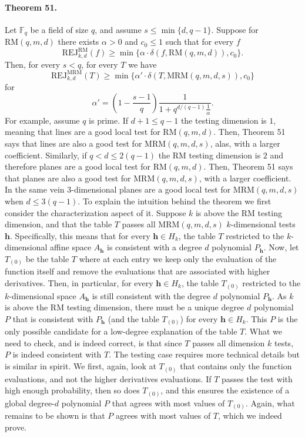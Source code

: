 \documentclass[10pt,a4paper]{article}
\begin{document}
\paragraph{Theorem 51.} Let $\mathbb F_q$ be a field of size $q$, and assume $s\leq\min\{d,q-1\}$. Suppose for $\mathrm{RM}(q,m,d)$ there exists $\alpha>0$ and $c_0\leq1$ such that for every $f$
\[\mathrm{REJ}_{k,d}^{\mathrm{RM}}(f)\geq\min\{\alpha\cdot\delta(f,\mathrm{RM}(q,m,d)),c_0\}.\]
Then, for every $s<q$, for every $T$ we have
\[\mathrm{REJ}_{k,d}^{\mathrm{MRM}}(T)\geq\min\{\alpha'\cdot\delta(T,\mathrm{MRM}(q,m,d,s)),c_0\}\tag{6}\]
for
\[\alpha'=\left(1-\frac{s-1}{q}\right)\frac1{1+q^{d/(q-1)}\frac1\alpha}.\tag{7}\]
For example, assume $q$ is prime. If $d+1\leq q-1$ the testing dimension is $1$, meaning that lines are a good local test for $\mathrm{RM}(q,m,d)$. Then, Theorem 51 says that lines are also a good test for $\mathrm{MRM}(q,m,d,s)$, alas, with a larger coefficient. Similarly, if $q<d\leq2(q-1)$ the RM testing dimension is $2$ and therefore planes are a good local test for $\mathrm{RM}(q,m,d)$. Then, Theorem 51 says that planes are also a good test for $\mathrm{MRM}(q,m,d,s)$, with a larger coefficient. In the same vein 3-dimensional planes are a good local test for $\mathrm{MRM}(q,m,d,s)$ when $d\leq3(q-1)$.
To explain the intuition behind the theorem we first consider the characterization aspect of it. Suppose $k$ is above the RM testing dimension, and that the table $T$ passes all $\mathrm{MRM}(q,m,d,s)$ $k$-dimensional tests $\boldsymbol h$. Specifically, this means that for every $\boldsymbol h\in H_k$, the table $T$ restricted to the $k$-dimensional affine space $A_{\boldsymbol h}$ is consistent with a degree $d$ polynomial $P_{\boldsymbol h}$. Now, let $T_{(0)}$ be the table $T$ where at each entry we keep only the evaluation of the function itself and remove the evaluations that are associated with higher derivatives. Then, in particular, for every $\boldsymbol h\in H_k$, the table $T_{(0)}$ restricted to the $k$-dimensional space $A_{\boldsymbol h}$ is still consistent with the degree $d$ polynomial $P_{\boldsymbol h}$. As $k$ is above the RM testing dimension, there must be a unique degree $d$ polynomial $P$ that is consistent with $P_{\boldsymbol h}$ (and the table $T_{(0)}$) for every $\boldsymbol h\in H_k$. This $P$ is the only possible candidate for a low-degree explanation of the table $T$. What we need to check, and is indeed correct, is that since $T$ passes all dimension $k$ tests, $P$ is indeed consistent with $T$.
The testing case requires more technical details but is similar in spirit. We first, again, look at $T_{(0)}$ that contains only the function evaluations, and not the higher derivatives evaluations. If $T$ passes the test with high enough probability, then so does $T_{(0)}$, and this ensures the existence of a global degree-$d$ polynomial $P$ that agrees with most values of $T_{(0)}$. Again, what remains to be shown is that $P$ agrees with most values of $T$, which we indeed prove.
\end{document}
